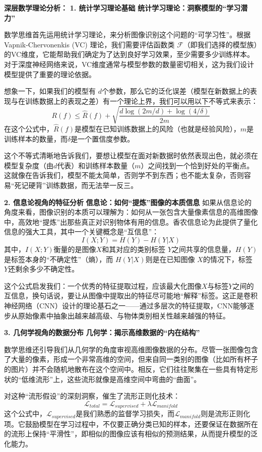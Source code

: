 \textbf{深层数学理论分析：}
\textbf{1. 统计学习理论基础}
\textbf{统计学习理论：洞察模型的“学习潜力”}

数学思维首先运用统计学习理论，来分析图像识别这个问题的“可学习性”。根据 Vapnik-Chervonenkis (VC) 理论，我们需要评估函数类 $\mathcal{F}$（即我们选择的模型族）的VC维度，它能帮助我们确定为了达到良好学习效果，至少需要多少训练样本。对于深度神经网络来说，VC维度通常与模型参数的数量密切相关，这为我们设计模型提供了重要的理论依据。

想象一下，如果我们的模型有 $d$个参数，那么它的泛化误差（模型在新数据上的表现与在训练数据上的表现之差）有一个理论上界，我们可以用以下不等式来表示：
$$R(f) \leq \hat{R}(f) + \sqrt{\frac{d \log(2m/d) + \log(4/\delta)}{2m}}$$
在这个公式中，$\hat{R}(f)$是模型在已知训练数据上的风险（也就是经验风险），$m$是训练样本的数量，而$\delta$是一个置信度参数。

这个不等式清晰地告诉我们，要想让模型在面对新数据时依然表现出色，就必须在模型复杂度（由$d$代表）和训练样本数量（$m$）之间找到一个恰到好处的平衡点。这就像在告诉我们，模型不能太简单，否则学不到东西；也不能太复杂，否则容易“死记硬背”训练数据，而无法举一反三。
 
 \textbf{2. 信息论视角的特征分析}
\textbf{信息论：如何“提炼”图像的本质信息}
如果从信息论的角度来看，图像识别的本质可以理解为：如何从一张包含大量像素信息的高维图像中，高效地“提炼”出那些真正对识别物体有用的信息。香农信息论为此提供了量化信息的强大工具，其中一个关键概念是“互信息”：
$$I(X; Y) = H(Y) - H(Y|X)$$
其中，$I(X; Y)$衡量的是图像$X$和其对应的类别标签 $Y$之间共享的信息量，$H(Y)$ 是标签本身的“不确定性”（熵），而 $H(Y|X)$则是在已知图像 $X$的情况下，标签 $Y$还剩余多少不确定性。

这个公式启发我们：一个优秀的特征提取过程，应该最大化图像$X$与标签$Y$之间的互信息，换句话说，要让从图像中提取出的特征尽可能地“解释”标签。这正是卷积神经网络（CNN）设计的理论基石之一——通过多层次的特征提取，CNN能够逐步从原始像素中抽象出越来越高级、与物体类别相关性越来越强的特征。

\textbf{3. 几何学视角的数据分布}
\textbf{几何学：揭示高维数据的“内在结构”}

数学思维还引导我们从几何学的角度审视高维图像数据的分布。尽管一张图像包含了大量的像素，形成一个非常高维的空间，但来自同一类别的图像（比如所有杯子的图片）并不会随机地散布在这个空间中。相反，它们往往聚集在一些具有特定形状的“低维流形”上，这些流形就像是高维空间中弯曲的“曲面”。

对这种“流形假设”的深刻洞察，催生了流形正则化技术：
$$\mathcal{L}_{total} = \mathcal{L}_{supervised} + \lambda \mathcal{L}_{manifold}$$
这个公式中，$\mathcal{L}_{supervised}$是我们熟悉的监督学习损失，而$\mathcal{L}_{manifold}$则是流形正则化项。它鼓励模型在学习过程中，不仅要正确分类已知的样本，还要保证在数据所在的流形上保持“平滑性”，即相似的图像应该有相似的预测结果，从而提升模型的泛化能力。

